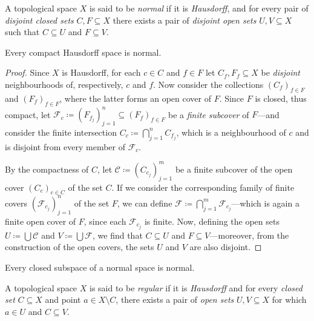 \begin{definition}
\label{def:normal-space}
A topological space \(X\) is said to be \emph{normal} if it is \emph{Hausdorff},
and for every pair of \emph{disjoint closed sets} \(C, F \subseteq X\) there
exists a pair of \emph{disjoint open sets} \(U, V \subseteq X\) such that
\(C \subseteq U\) and \(F \subseteq V\).
\end{definition}

\begin{proposition}
\label{prop:compact-hausdorff-is-normal}
Every compact Hausdorff space is normal.
\end{proposition}

\begin{proof}
Since \(X\) is Hausdorff, for each \(c \in C\) and \(f \in F\) let
\(C_f, F_f \subseteq X\) be \emph{disjoint} neighbourhoods of, respectively,
\(c\) and \(f\). Now consider the collections \((C_f)_{f \in F}\) and
\((F_f)_{f \in F}\), where the latter forms an open cover of \(F\). Since
\(F\) is closed, thus compact, let
\(\mathcal{F}_c \coloneq (F_{f_j})_{j=1}^n \subseteq (F_f)_{f \in F}\) be a
\emph{finite subcover} of \(F\)---and consider the finite intersection
\(C_c \coloneq \bigcap_{j=1}^n C_{f_j}\), which is a neighbourhood of \(c\) and
is disjoint from every member of \(\mathcal{F}_c\).

By the compactness of \(C\), let \(\mathcal{C} \coloneq (C_{c_j})_{j=1}^m\) be a
finite subcover of the open cover \((C_c)_{c \in C}\) of the set \(C\). If we
consider the corresponding family of finite covers
\((\mathcal{F}_{c_j})_{j=1}^n\) of the set \(F\), we can define
\(\mathcal{F} \coloneq \bigcap_{j=1}^m \mathcal{F}_{c_j}\)---which is again a
finite open cover of \(F\), since each \(\mathcal{F}_{c_j}\) is finite. Now,
defining the open sets \(U \coloneq \bigcup \mathcal{C}\) and
\(V \coloneq \bigcup \mathcal{F}\), we find that \(C \subseteq U\) and
\(F \subseteq V\)---moreover, from the construction of the open covers, the
sets \(U\) and \(V\) are also disjoint.
\end{proof}

\begin{corollary}
\label{cor:closed-subspace-is-normal}
Every closed subspace of a normal space is normal.
\end{corollary}

\begin{definition}
\label{def:regular-space}
A topological space \(X\) is said to be \emph{regular} if it is \emph{Hausdorff}
and for every \emph{closed set} \(C \subseteq X\) and point \(a \in X \setminus
C\), there exists a pair of \emph{open sets} \(U, V \subseteq X\) for which \(a
\in U\) and \(C \subseteq V\).
\end{definition}


